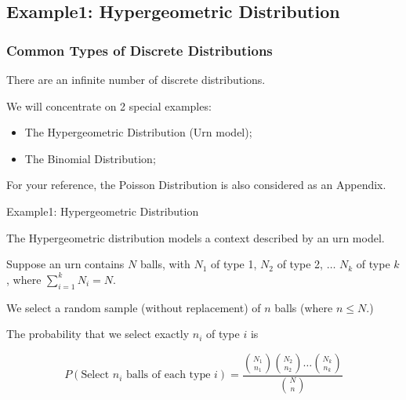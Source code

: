 \documentclass[t,xcolor=pdftex,dvipsnames,table]{beamer}\usepackage[]{graphicx}\usepackage[]{color}
\begin{document}
\subsection{Example1: Hypergeometric Distribution}

\begin{frame}\frametitle{Common Types of Discrete Distributions}
There are an infinite number of discrete distributions. 

\vspace{0.5cm}
We will concentrate on 2 special examples: 
\begin{itemize}
\item The Hypergeometric Distribution (Urn model);
\item The Binomial Distribution;
\end{itemize}

For your reference, the Poisson Distribution is also considered as an Appendix.
\end{frame}

\begin{frame}[fragile]{Example1: Hypergeometric Distribution}

\begin{definition}
The \alert{Hypergeometric distribution} models a context described by an urn model.

\vspace{.5cm}
Suppose an urn contains $N$ balls, with $N_{1}$ of type 1, $N_{2}$ of type 2, $\ldots$ $N_{k}$ of type $k$, where $\sum_{i=1}^{k} N_{i} = N$.

\vspace{.5cm}
We select a random sample (without replacement) of $n$ balls (where $n \leq N$.)

\vspace{.5cm}
The probability that we select exactly $n_{i}$ of type $i$ is 

\[ P( \mbox{Select $n_{i}$ balls of each type $i$} )   = 
\frac{ { N_{1} \choose n_{1}}  {N_{2} \choose n_{2}} \ldots {N_{k} \choose n_{k}}  }{ {N \choose n} }
\]

\end{definition}
\hyperlink{Factorials}{}
\hyperlink{BinomialCoefficients}{}
\end{frame}
\end{document}
